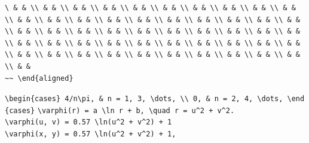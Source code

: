 \documentclass[
  ukrainian,
]{article}
\begin{document}
\begin{verbatim}
\ & & \\ & & \\ & & \\ & & \\ & & \\ & & \\ & & \\ & & \\ & & \\ & & \\ & & \\ & & \\ & & \\ & & \\ & & \\ & & \\ & & \\ & & \\ & & \\ & & \\ & & \\ & & \\ & & \\ & & \\ & & \\ & & \\ & & \\ & & \\ & & \\ & & \\ & & \\ & & \\ & & \\ & & \\ & & \\ & & \\ & & \\ & & \\ & & \\ & & \\ & & \\ & & \\ & & \\ & & \\ & & \\ & & \\ & & \\ & & \\ & & \\ & & \\ & &
~~ \end{aligned}
\end{verbatim}

\texttt{\textbackslash{}begin\{cases\}\ 4/n\textbackslash{}pi,\ \&\ n\ =\ 1,\ 3,\ \textbackslash{}dots,\ \textbackslash{}\textbackslash{}\ 0,\ \&\ n\ =\ 2,\ 4,\ \textbackslash{}dots,\ \textbackslash{}end\{cases\}}
\texttt{\textbackslash{}varphi(r)\ =\ a\ \textbackslash{}ln\ r\ +\ b,\ \textbackslash{}quad\ r\ =\ u\^{}2\ +\ v\^{}2.}
\texttt{\textbackslash{}varphi(u,\ v)\ =\ 0.57\ \textbackslash{}ln(u\^{}2\ +\ v\^{}2)\ +\ 1}
\texttt{\textbackslash{}varphi(x,\ y)\ =\ 0.57\ \textbackslash{}ln(u\^{}2\ +\ v\^{}2)\ +\ 1,}
\end{document}
